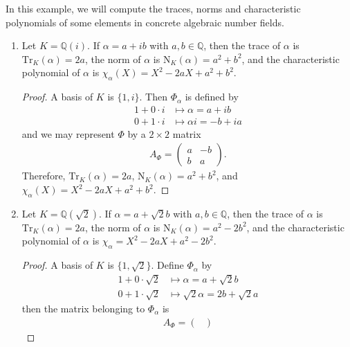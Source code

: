 \begin{example}
    In this example, we will compute the traces, norms and characteristic polynomials of some elements in concrete algebraic number fields.
    \begin{enumerate}
    \item Let \(K = \mathbb{Q}(i)\). If \(\alpha = a + ib\) with \(a, b \in \mathbb{Q}\), then the trace of \(\alpha\) is \(\mathrm{Tr}_K(\alpha) = 2a\), the norm of \(\alpha\) is \(\mathrm{N}_K(\alpha) = a^2 + b^2\), and the characteristic polynomial of \(\alpha\) is \(\chi_\alpha (X) = X^2 - 2a X + a^2 + b^2\).
    \begin{proof}
        A basis of \(K\) is \(\{1, i\}\). Then \(\Phi_\alpha\) is defined by
        \begin{align*}
            1 + 0 \cdot i &\mapsto \alpha = a + ib\\
            0 + 1 \cdot i &\mapsto \alpha i = -b + i a
        \end{align*}
        and we may represent \(\Phi\) by a \(2 \times 2\) matrix
        \begin{align*}
            A_\Phi = \begin{pmatrix}
                a & -b \\ b & a
            \end{pmatrix} \text{.}
        \end{align*}
        Therefore, \(\mathrm{Tr}_K(\alpha) = 2a\), \(\mathrm{N}_K(\alpha) = a^2 + b^2\), and \(\chi_\alpha (X) = X^2 - 2a X + a^2 + b^2\).
    \end{proof}
    \item Let \(K = \mathbb{Q}(\sqrt{2})\). If \(\alpha = a + \sqrt{2}b\) with \(a, b \in \mathbb{Q}\), then the trace of \(\alpha\) is \(\mathrm{Tr}_K(\alpha) = 2a\), the norm of \(\alpha\) is \(\mathrm{N}_K(\alpha) = a^2 - 2b^2\), and the characteristic polynomial of \(\alpha\) is \(\chi_\alpha = X^2 - 2a X + a^2 - 2b^2\).
    \begin{proof}
        A basis of \(K\) is \(\{1, \sqrt{2}\}\). Define \(\Phi_\alpha\) by
        \begin{align*}
            1 + 0 \cdot \sqrt{2} &\mapsto \alpha = a + \sqrt{2} b \\
            0 + 1 \cdot \sqrt{2} &\mapsto \sqrt{2} \alpha = 2b + \sqrt{2}a
        \end{align*}
        then the matrix belonging to \(\Phi_\alpha\) is
        \begin{align*}
            A_\Phi = \begin{pmatrix}

\end{pmatrix}
\end{align*}
\end{proof}
\end{enumerate}
\end{example}
